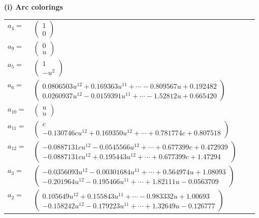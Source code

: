 \documentclass[1p]{elsarticle_modified}
\theoremstyle{definition}
\begin{document}
\flushleft \textbf{(i) Arc colorings}\\
\begin{tabular}{m{7pt} m{180pt} m{7pt} m{180pt} }
\flushright $a_{4}=$&$\begin{pmatrix}1\\0\end{pmatrix}$ \\
\flushright $a_{9}=$&$\begin{pmatrix}0\\u\end{pmatrix}$ \\
\flushright $a_{5}=$&$\begin{pmatrix}1\\- u^2\end{pmatrix}$ \\
\flushright $a_{6}=$&$\begin{pmatrix}0.0806503 u^{12}+0.169363 u^{11}+\cdots-0.809567 u+0.192482\\0.0260937 u^{12}-0.0159391 u^{11}+\cdots-1.52812 u+0.665420\end{pmatrix}$ \\
\flushright $a_{10}=$&$\begin{pmatrix}u\\u\end{pmatrix}$ \\
\flushright $a_{11}=$&$\begin{pmatrix}c\\-0.130746 c u^{12}+0.169350 u^{12}+\cdots+0.781774 c+0.807518\end{pmatrix}$ \\
\flushright $a_{12}=$&$\begin{pmatrix}-0.0887131 c u^{12}-0.0545566 u^{12}+\cdots+0.677399 c+0.472939\\-0.0887131 c u^{12}+0.195443 u^{12}+\cdots+0.677399 c+1.47294\end{pmatrix}$ \\
\flushright $a_{3}=$&$\begin{pmatrix}-0.0356093 u^{12}-0.00301684 u^{11}+\cdots+0.564974 u+1.08093\\-0.201964 u^{12}-0.195466 u^{11}+\cdots+1.82111 u-0.0563709\end{pmatrix}$ \\
\flushright $a_{2}=$&$\begin{pmatrix}0.105649 u^{12}+0.155843 u^{11}+\cdots-0.983332 u+1.00693\\-0.158242 u^{12}-0.179223 u^{11}+\cdots+1.32649 u-0.126777\end{pmatrix}$ \\

\end{tabular}
\end{document}
